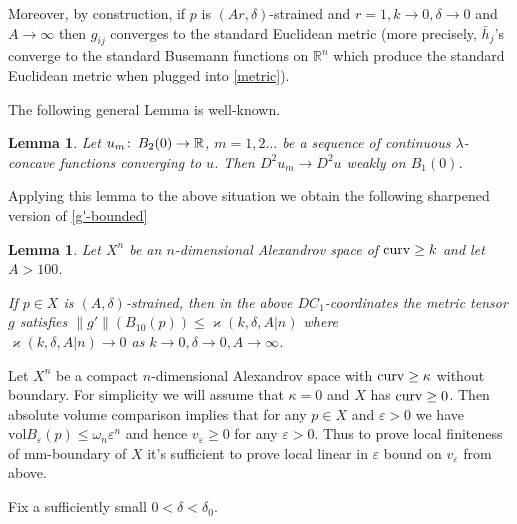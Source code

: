 \documentclass[12pt,leqno]{amsart}
\numberwithin{equation}{section}
\newtheorem{lem}[thm]{Lemma}
\theoremstyle{definition}
\theoremstyle{remark}
\newcommand{\vol}{\mathrm{vol}}
\newcommand{\R}{\mathbb{R}}
\def\co{\colon\thinspace}
\def\eps{\varepsilon}
\newcommand{\curv}{\mathop{\rm curv}}
\begin{document}
Moreover, by construction, if $p$ is $(Ar,\delta)$-strained and $r=1,k\to 0,\delta\to 0$ and $A\to\infty$ then $g_{ij}$ converges to the standard Euclidean metric (more precisely, $\bar h_j$'s converge to the standard Busemann functions on $\R^n$ which produce the standard Euclidean metric when plugged into \eqref{metric}).



The following general Lemma is well-known.
\begin{lem}\label{concave-der-conv}
Let $u_m\co B_2(0)\to\R$, $m=1,2\ldots$ be a sequence of continuous $\lambda$-concave functions converging to $u$.
Then $D^2u_m\to D^2 u$ weakly on $B_1(0)$.
\end{lem}

Applying this lemma to the above situation we obtain the following sharpened version of \eqref{g'-bounded}

 \begin{lem}\label{lem-per-dc-1}
 Let $X^n$ be an $n$-dimensional Alexandrov space of $\curv\ge k$ and let $A>100$.

 If  $p\in X$ is
   $(A,\delta)$-strained, then  in the above $DC_1$-coordinates
the metric tensor $g$ satisfies $\|g'\| (B_{10}(p)) \leq \varkappa( k,\delta,A| n)$ where\\ $\varkappa(k,\delta,A| n)\to 0$ as $k\to 0, \delta\to 0,A\to\infty$.
 \end{lem}



 Let $X^n$ be a compact  $n$-dimensional Alexandrov space with $\curv\ge\kappa$ without boundary. For simplicity we will assume that  $\kappa=0$ and $X$ has $\curv\ge 0$.
 Then absolute volume comparison implies that for any $p\in X$ and $\eps>0$ we have $\vol B_\eps(p)\le \omega_n\eps^n$ and hence $v_\eps\ge 0$ for any $\eps>0$. Thus to prove local finiteness of mm-boundary of $X$ it's sufficient to prove local linear in $\eps$ bound on $v_\eps$ from above.

 Fix a sufficiently small $0<\delta<\delta_0$.


\end{document}
